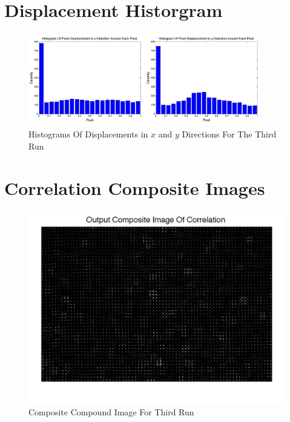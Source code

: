 

\chapter{Displacement Historgram}


\begin{figure}[H]
\centering
\includegraphics[width=0.9\textwidth]{pics/figure6_run3.png}
\caption{Histograms Of Displacements in $x$ and $y$ Directions For The Third Run}
\label{pic:6r3}
\end{figure}


\chapter{Correlation Composite Images}
\begin{figure}[h]
\centering
\includegraphics[width=\textwidth]{pics/figure1_run2.png}
\caption{Composite Compound Image For Third Run}
\label{pic:1r2}
\end{figure}



